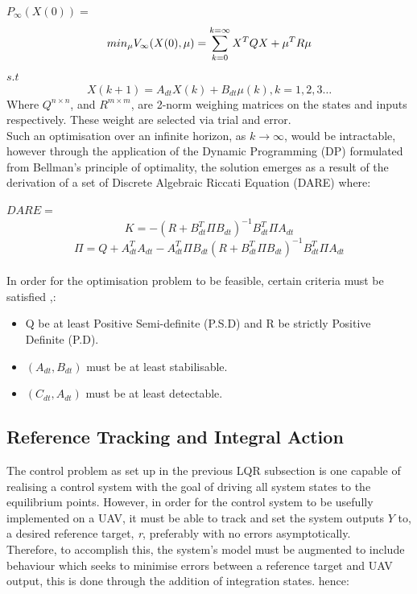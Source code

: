 \documentclass[12pt,a4paper,twoside]{report}
\begin{document}
				\(P_\infty(X(0)) = \)				
				\begin{equation}
					min_\mu  V_\infty(X(0),\emph{\emph{$\mu$}}) = \sum_{k = 0}^{k = \infty} X^{T} Q X + \mu^{T} R \mu
				\end{equation}
				\(s.t\)
				\[
					X(k+1) = A_{dt}X(k) + B_{dt} \mu(k) , k=1,2,3\dots
				\]
				Where $Q^{n \times n}$, and $R^{m \times m}$, are 2-norm weighing matrices on the states and inputs respectively. These weight are selected via trial and error.
				\\
				Such an optimisation over an infinite horizon, as \(k \to \infty \), would be intractable, however through the application of the Dynamic Programming (DP) formulated from Bellman's principle of optimality, the solution emerges as a result of the derivation of a set of Discrete Algebraic Riccati Equation (DARE) \cite{25} where:
				
				\(DARE = \)
				\[
					K = - (R + B_{dt}^{T} \Pi B_{dt})^{-1} B_{dt}^{T} \Pi A_{dt}
				\]
				\begin{equation}
					\Pi = Q + A_{dt}^{T} A_{dt} - A_{dt}^{T} \Pi B_{dt}(R + B_{dt}^{T} \Pi B_{dt})^{-1} B_{dt}^{T} \Pi A_{dt}
				\end{equation}
				\\
				In order for the optimisation problem to be feasible, certain criteria must be satisfied \cite{18},\cite{25}:
				
				\begin{itemize}
					\item
						Q be at least Positive Semi-definite (P.S.D) and R be strictly Positive Definite (P.D).
					\item
						\( (A_{dt},B_{dt}) \) must be at least stabilisable.
					\item
						\( (C_{dt},A_{dt}) \) must be at least detectable.
				\end{itemize} 
			
			\subsection{Reference Tracking and Integral Action}
				
				The control problem as set up in the previous LQR subsection is one capable of realising a control system with the goal of driving all system states to the equilibrium points. However, in order for the control system to be usefully implemented on a UAV, it must be able to track and set the system outputs $Y$ to, a desired reference target, \emph{\emph{r}}, preferably with no errors asymptotically.
				\\
				Therefore, to accomplish this, the system's model must be augmented to include behaviour which seeks to minimise errors between a reference target and UAV output, this is done through the addition of integration states. hence:
				
\end{document}
